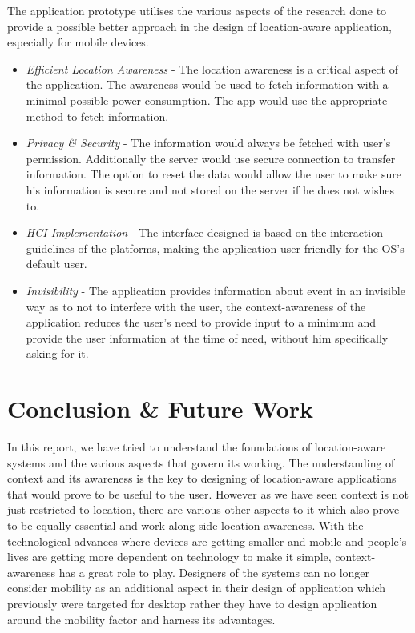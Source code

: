 \documentclass[12pt]{report}
\begin{document}
The application prototype utilises the various aspects of the research done to provide a possible better approach in the design of location-aware application, especially for mobile devices.
\begin{itemize}
\item \textit{Efficient Location Awareness} - The location awareness is a critical aspect of the application. The awareness would be used to fetch information with a minimal possible power consumption. The app would use the appropriate method to fetch information.

\item \textit{Privacy \& Security} - The information would always be fetched with user's permission. Additionally the server would use secure connection to transfer information. The option to reset the data would allow the user to make sure his information is secure and not stored on the server if he does not wishes to.

\item \textit{HCI Implementation} - The interface designed is based on the interaction guidelines of the platforms, making the application user friendly for the OS's default user.

\item \textit{Invisibility} - The application provides information about event in an invisible way as to not to interfere with the user, the context-awareness of the application reduces the user's need to provide input to a minimum and provide the user information at the time of need, without him specifically asking for it.
\end{itemize}

\chapter{Conclusion \& Future Work}
In this report, we have tried to understand the foundations of location-aware systems and the various aspects that govern its working. The understanding of context and its awareness is the key to designing of location-aware applications that would prove to be useful to the user. However as we have seen context is not just restricted to location, there are various other aspects to it which also prove to be equally essential and work along side location-awareness. With the technological advances where devices are getting smaller and mobile and people's lives are getting more dependent on technology to make it simple, context-awareness has a great role to play. Designers of the systems can no longer consider mobility as an additional aspect in their design of application which previously were targeted for desktop rather they have to design application around the mobility factor and harness its advantages.
\end{document}
